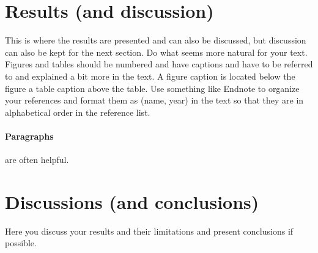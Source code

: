 \documentclass{article}
\begin{document}
\begin{multicols}{2}
\section*{Results (and discussion)}

This is where the results are presented and can also be discussed, but discussion can also be 
kept for the next section. Do what seems more natural for your text. 
Figures and tables should be numbered and have captions and have to be referred to and 
explained a bit more in the text. 
A figure caption is located below the figure a table caption above the table. 
Use something like Endnote to organize your references and format them as (name, year) in 
the text so that they are in alphabetical order in the reference list. 


\paragraph{Paragraphs} are often helpful.

\section*{Discussions (and conclusions)}

Here you discuss your results and their limitations and present conclusions if possible.

\end{multicols}
\clearpage
{}
\printbibliography
\end{document}

